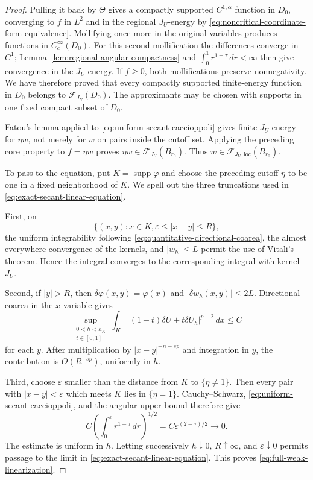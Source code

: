 \documentclass[10pt,a4paper]{amsart}
\newcommand{\dd}{\,d}
\begin{document}
\begin{proof}
Pulling it back by \(\Theta\) gives a compactly supported
\(C^{1,\alpha}\) function in \(D_0\), converging to \(f\) in
\(L^2\) and in the regional \(J_U\)-energy by
\eqref{eq:noncritical-coordinate-form-equivalence}.  Mollifying once
more in the original variables produces functions in
\(C_c^\infty(D_0)\).  For this second mollification the differences
converge in \(C^1\); Lemma~\ref{lem:regional-angular-compactness} and
\(\int_0^1r^{1-\tau}\dd r<\infty\) then give convergence in the
\(J_U\)-energy.  If \(f\ge0\), both mollifications preserve
nonnegativity.  We have
therefore proved that every compactly supported finite-energy function
in \(D_0\) belongs to \(\mathcal F_{J_U}(D_0)\).  The approximants may
be chosen with supports in one fixed compact subset of \(D_0\).

Fatou's lemma applied to \eqref{eq:uniform-secant-caccioppoli} gives
finite \(J_U\)-energy for \(\eta w\), not merely for \(w\) on pairs
inside the cutoff set.  Applying the preceding core property to
\(f=\eta w\) proves
\(\eta w\in\mathcal F_{J_U}(B_{r_0})\).  Thus
\(w\in\mathcal F_{J_U,\mathrm{loc}}(B_{r_0})\).

To pass to the equation, put
\(K=\operatorname{supp}\varphi\) and choose the preceding cutoff
\(\eta\) to be one in a fixed neighborhood of \(K\).  We spell out the
three truncations used in \eqref{eq:exact-secant-linear-equation}.

First, on
\[
 \{(x,y):x\in K,
       \varepsilon\le|x-y|\le R\},
\]
the uniform integrability following
\eqref{eq:quantitative-directional-coarea}, the almost everywhere
convergence of the kernels, and \(|w_h|\le L\) permit the use of
Vitali's theorem.  Hence the integral converges to the corresponding
integral with kernel \(J_U\).

Second, if \(|y|>R\), then \(\delta\varphi(x,y)=\varphi(x)\) and
\(|\delta w_h(x,y)|\le2L\).  Directional coarea in the \(x\)-variable
gives
\begin{equation*}
 \sup_{\substack{0<h<h_K\\t\in[0,1]}}\int_K
 |(1-t)\delta U+t\delta U_h|^{p-2}\dd x\le C
\end{equation*}
for each \(y\).  After multiplication by
\(|x-y|^{-n-sp}\) and integration in \(y\), the contribution is
\(O(R^{-sp})\), uniformly in \(h\).

Third, choose \(\varepsilon\) smaller than the distance from \(K\) to
\(\{\eta\ne1\}\).  Then every pair with \(|x-y|<\varepsilon\) which
meets \(K\) lies in \(\{\eta=1\}\).  Cauchy--Schwarz,
\eqref{eq:uniform-secant-caccioppoli}, and the angular upper bound
therefore give
\[
 C\left(\int_0^\varepsilon r^{1-\tau}\dd r\right)^{1/2}
 =C\varepsilon^{(2-\tau)/2}\longrightarrow0.
\]
The estimate is uniform in \(h\).  Letting successively
\(h\downarrow0\), \(R\uparrow\infty\), and
\(\varepsilon\downarrow0\) permits passage to the limit in
\eqref{eq:exact-secant-linear-equation}.  This proves
\eqref{eq:full-weak-linearization}.


\end{proof}
\end{document}
